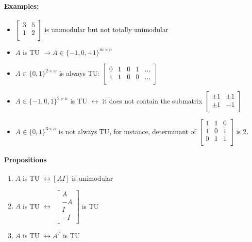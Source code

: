 \documentclass[main]{subfiles}
\begin{document}
\paragraph{Examples:}
\begin{itemize}
\item
$\begin{bmatrix}
3 & 5\\
1 & 2 \\
\end{bmatrix}$ is unimodular but not totally unimodular
\item $A$ is TU $\rightarrow A \in \{-1, 0, +1\}^{m \times n}$
\item $A \in \{0, 1\}^{2 \times w}$ is always TU: 
$\begin{bmatrix}
0 & 1 & 0 & 1 & \dots \\
1 & 1 & 0 & 0 & \dots \\
\end{bmatrix}$
\item $A \in \{-1, 0, 1\}^{2 \times n}$ is TU $\leftrightarrow$ it does not
contain the submatrix 
$\begin{bmatrix}
\pm 1 & \pm 1 \\
\pm 1 & -1  \\
\end{bmatrix}$
\item $A \in \{0,1\}^{3 \times n}$ is not always TU, for instance, determinant
of 
$\begin{bmatrix}
1 & 1 & 0 \\
1 & 0 & 1 \\
0 & 1 & 1 \\
\end{bmatrix}$ is 2.
\end{itemize}

\paragraph{Propositions}
\begin{enumerate}
\item $A$ is TU $\leftrightarrow [AI]$ is unimodular
\item $A$ is TU $\leftrightarrow$
$\begin{bmatrix}
A \\
-A \\
I \\
-I \\
\end{bmatrix}$ is TU
\item $A$ is TU $\leftrightarrow A^{T}$ is TU
\end{enumerate}
\end{document}
